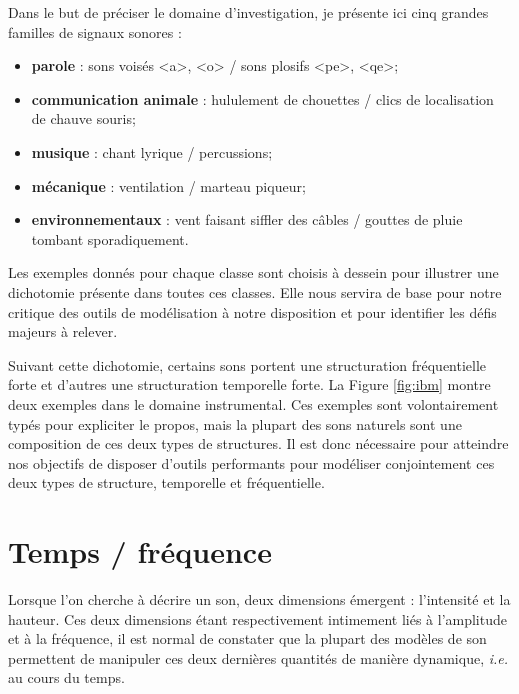 Dans le but de préciser le domaine d'investigation, je présente ici cinq grandes familles de signaux sonores :
\begin{itemize}
  \item \textbf{parole} : sons voisés <a>, <o> / sons plosifs <pe>, <qe>;
  \item \textbf{communication animale} : hululement de chouettes / clics de localisation de chauve souris;
  \item \textbf{musique} : chant lyrique / percussions;
  \item \textbf{mécanique} : ventilation / marteau piqueur;
  \item \textbf{environnementaux} : vent faisant siffler des câbles / gouttes de pluie tombant sporadiquement.
\end{itemize}

Les exemples donnés pour chaque classe sont choisis à dessein pour illustrer une dichotomie présente dans toutes ces classes. Elle nous servira de base pour notre critique des outils de modélisation à notre disposition et pour identifier les défis majeurs à relever.

Suivant cette dichotomie, certains sons portent une structuration fréquentielle forte et d'autres une structuration temporelle forte. La Figure \ref{fig:ibm} montre deux exemples dans le domaine instrumental. Ces exemples sont volontairement typés pour expliciter le propos, mais la plupart des sons naturels sont une composition de ces deux types de structures. Il est donc nécessaire pour atteindre nos objectifs de disposer d'outils performants pour modéliser conjointement ces deux types de structure, temporelle et fréquentielle.

\section{ \nmu Temps / fréquence} \label{sec:tf}

Lorsque l'on cherche à décrire un son, deux dimensions émergent : l'intensité et la hauteur. Ces deux dimensions étant respectivement intimement liés à l'amplitude et à la fréquence, il est normal de constater que la plupart des modèles de son permettent de manipuler ces deux dernières quantités de manière dynamique, \textit{i.e.} au cours du temps.



